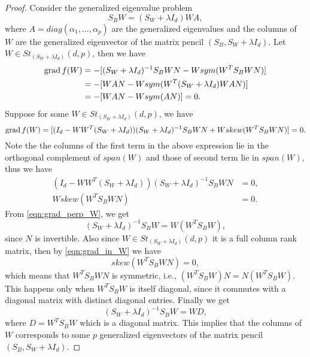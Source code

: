 \documentclass[11pt,a4paper]{article}
\begin{document}
\begin{proof}
\converse Consider the generalized eigenvalue problem
\begin{equation*}
S_BW = (S_W+\lambda I_d)WA,
\end{equation*}
where $A = diag(\alpha_1,\ldots,\alpha_p)$ are the generalized eigenvalues and the columns of $W$ are the generalized eigenvector of the matrix pencil $(S_B,S_W+\lambda I_d)$. Let $W\in St_{(S_W+\lambda I_d)}(d,p)$, then we have
\begin{align*}
\text{grad}\, f(W) &= -[(S_W+\lambda I_d)^{-1}S_BWN - Wsym(W^TS_BWN)]\\
&= -[WAN - Wsym(W^T(S_W+\lambda I_d)WAN)] \\
&= -[WAN - Wsym(AN)] = 0.
\end{align*}
\forward Suppose for some $W\in St_{(S_W+\lambda I_d)}(d,p)$, we have \begin{equation*}
\text{grad}\, f(W) = [(I_d-WW^T(S_W+\lambda I_d))(S_W+\lambda I_d)^{-1}S_BWN + Wskew(W^TS_BWN)] = 0.
\end{equation*}
Note the the columns of the first term in the above expression lie in the orthogonal complement of $span(W)$ and those of second term lie in $span(W)$, thus we have
\begin{align}
(I_d-WW^T(S_W+\lambda I_d))(S_W+\lambda I_d)^{-1}S_BWN &= 0,\label{eqn:grad_perp_W}\\  Wskew(W^TS_BWN) &= 0.\label{eqn:grad_in_W}
\end{align}
From \eqref{eqn:grad_perp_W}, we get
\begin{equation*}
(S_W+\lambda I_d)^{-1}S_BW = W(W^TS_BW),
\end{equation*}
since $N$ is invertible. Also since $W\in St_{(S_W+\lambda I_d)}(d,p)$ it is a full column rank matrix, then by \eqref{eqn:grad_in_W} we have
\begin{equation*}
skew(W^TS_BWN) = 0,
\end{equation*}
which means that $W^TS_BWN$ is symmetric, i.e., $(W^TS_BW)N = N(W^TS_BW)$. This happens only when $W^TS_BW$ is itself diagonal, since it commutes with a diagonal matrix with distinct diagonal entries. Finally we get
\begin{equation*}
(S_W+\lambda I_d)^{-1}S_BW = WD,
\end{equation*}
where $D = W^TS_BW$ which is a diagonal matrix. This implies that the columns of $W$ corresponds to some $p$ generalized eigenvectors of the matrix pencil $(S_B,S_W+\lambda I_d)$.
\end{proof}
\end{document}
